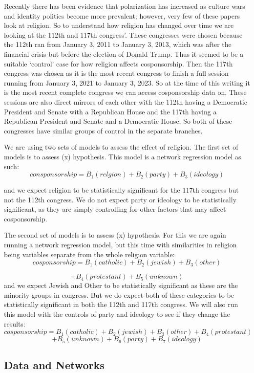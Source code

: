 \documentclass[Royal,times,sageh]{sagej}
\begin{document}
Recently there has been evidence that polarization has increased as culture wars and identity politics become more prevalent; however, very few of these papers look at religion. So to understand how religion has changed over time we are looking at the 112th and 117th congress'. These congresses were chosen because the 112th ran from January 3, 2011 to January 3, 2013, which was after the financial crisis but before the election of Donald Trump. Thus it seemed to be a suitable `control' case for how religion affects cosponsorship. Then the 117th congress was chosen as it is the most recent congress to finish a full session running from January 3, 2021 to January 3, 2023. So at the time of this writing it is the most recent complete congress we can access cosponsorship data on. These sessions are also direct mirrors of each other with the 112th having a Democratic President and Senate with a Republican House and the 117th having a Republican President and Senate and a Democratic House. So both of these congresses have similar groups of control in the separate branches.

We are using two sets of models to assess the effect of religion. The first set of models is to assess (x) hypothesis. This model is a network regression model as such:
\[
consponsorship = B_1(relgion) + B_2(party) + B_3(ideology)
\]

and we expect religion to be statistically significant for the 117th congress but not the 112th congress. We do not expect party or ideology to be statistically significant, as they are simply controlling for other factors that may affect cosponsorship.

The second set of models is to assess (x) hypothesis. For this we are again running a network regression model, but this time with similarities in religion being variables separate from the whole religion variable:
\[
cosponsorship = B_1(catholic) + B_2(jewish) + B_3(other) 
\]

\[
+ B_4(protestant )+ B_5(unknown)
\]
and we expect Jewish and Other to be statistically significant as these are the minority groups in congress. But we do expect both of these categories to be statistically significant in both the 112th and 117th congress. We will also run this model with the controls of party and ideology to see if they change the results:
\[
cosponsorship = B_1(catholic) + B_2(jewish) + B_3(other) + B_4(protestant )
\]
\[
+ B_5(unknown) + B_6(party) + B_7(ideology)
\]

\hypertarget{data-and-networks}{%
\subsection{Data and Networks}\label{data-and-networks}}
\end{document}
